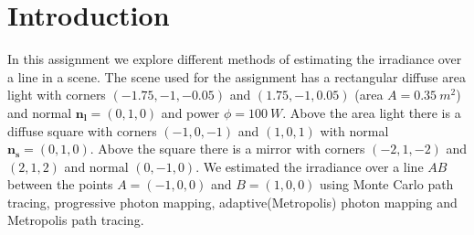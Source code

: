 \section*{Introduction}
In this assignment we explore different methods of estimating the irradiance over a line in a scene. The scene used for the assignment has a rectangular diffuse area light with corners $(-1.75,-1,-0.05)$ and $(1.75,-1,0.05)$ (area $A=0.35\ m^2$) and normal $\mathbf{n_l}=(0,1,0)$ and power $\phi=100\ W$. Above the area light there is a diffuse square with corners $(-1,0,-1)$ and $(1,0,1)$ with normal $\mathbf{n_s}=(0,1,0)$. Above the square there is a mirror with corners $(-2,1,-2)$ and $(2,1,2)$ and normal $(0,-1,0)$. We estimated the irradiance over a line $AB$ between the points $A=(-1,0,0)$ and $B=(1,0,0)$ using Monte Carlo path tracing, progressive photon mapping, adaptive(Metropolis) photon mapping and Metropolis path tracing. 
